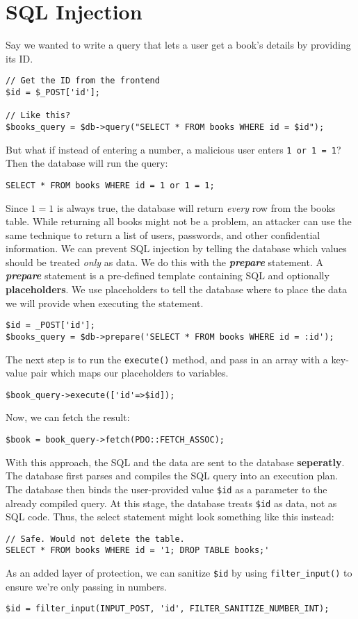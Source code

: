 \documentclass{report}
\begin{document}
\section{SQL Injection}
Say we wanted to write a query that lets a user get a book's details by providing its ID.
\begin{verbatim}
// Get the ID from the frontend
$id = $_POST['id'];

// Like this?
$books_query = $db->query("SELECT * FROM books WHERE id = $id");
\end{verbatim}
But what if instead of entering a number, a malicious user enters \texttt{1 or 1 = 1}?
\bigbreak \noindent
Then the database will run the query:
\begin{verbatim}
SELECT * FROM books WHERE id = 1 or 1 = 1;
\end{verbatim}
Since $1=1$ is always true, the database will return \textit{every} row from the books table. While returning all books might not be a problem, an attacker can use the same technique to return a list of users, passwords, and other confidential information.
\bigbreak \noindent
We can prevent SQL injection by telling the database which values should be treated \textit{only} as data. We do this with the \textit{\textbf{prepare}} statement.
\bigbreak \noindent
A \textit{\textbf{prepare}} statement is a pre-defined template containing SQL and optionally \textbf{placeholders}. We use placeholders to tell the database where to place the data we will provide when executing the statement.
\begin{verbatim}
$id = _POST['id'];
$books_query = $db->prepare('SELECT * FROM books WHERE id = :id');
\end{verbatim}
The next step is to run the \texttt{execute()} method, and pass in an array with a key-value pair which maps our placeholders to variables.
\begin{verbatim}
$book_query->execute(['id'=>$id]);
\end{verbatim}
Now, we can fetch the result:
\begin{verbatim}
$book = book_query->fetch(PDO::FETCH_ASSOC);
\end{verbatim}
With this approach, the SQL and the data are sent  to the database \textbf{seperatly}. The database first parses and compiles the SQL query into an execution plan. The database then binds the user-provided value \texttt{\$id} as a parameter to the already compiled query. At this stage, the database treats \texttt{\$id} as data, not as SQL code. Thus, the select statement might look something like this instead:
\begin{verbatim}
// Safe. Would not delete the table.
SELECT * FROM books WHERE id = '1; DROP TABLE books;'
\end{verbatim}
As an added layer of protection, we can sanitize \texttt{\$id} by using \texttt{filter\_input()} to ensure we're only passing in numbers.
\begin{verbatim}
$id = filter_input(INPUT_POST, 'id', FILTER_SANITIZE_NUMBER_INT);

\end{verbatim}
\end{document}
